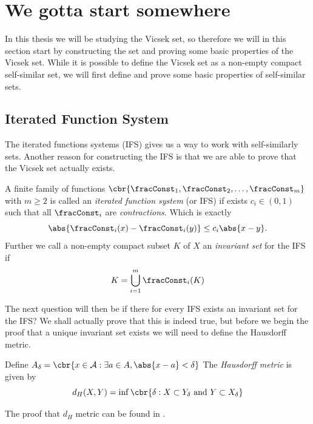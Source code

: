 \chapter{We gotta start somewhere}
In this thesis we will be studying the Vicsek set, so therefore we will in this section start by constructing the set and proving some basic properties of the Vicsek set. While it is possible to define the Vicsek set as a non-empty compact self-similar set, we will first define and prove some basic properties of self-similar sets.

\section{Iterated Function System}
The iterated functions systems (IFS) gives us a way to work with self-similarly sets. Another reason for constructing the IFS is that we are able to prove that the Vicsek set actually exists.

\begin{defi}
	A finite family of functions $\cbr{\fracConst_1, \fracConst_2, \ldots, \fracConst_m}$ with $m \geq 2$ is called an \emph{iterated function system} (or IFS) if exists $c_i \in (0, 1)$ such that all $\fracConst_i$ are \emph{contractions}. Which is exactly
	\begin{equation}
		\abs{\fracConst_i(x) -\fracConst_i(y)} \leq c_i \abs{x-y}.
	\end{equation}
	Further we call a non-empty compact subset $K$ of $X$ an \emph{invariant set} for the IFS if
	\begin{equation}\label{invariantSet}
		K = \bigcup_{i = 1}^{m} \fracConst_i(K)
	\end{equation}
\end{defi}


The next question will then be if there for every IFS exists an invariant set for the IFS? We shall actually prove that this is indeed true, but before we begin the proof that a unique invariant set exists we will need to define the Hausdorff metric.
\begin{defi}
	Define $A_{\delta} = \cbr{x \in \mathcal{A} : \exists a \in A, \abs{x-a} < \delta }$ 
	The \emph{Hausdorff metric} is given by
	\begin{equation}
		d_H(X,Y) = \inf \cbr{\delta : X \subset Y_\delta \text{ and } Y \subset X_\delta}
	\end{equation}
\end{defi}
The proof that $d_H$ metric can be found in \cite{Henrikson1999CompletenessAT}.


